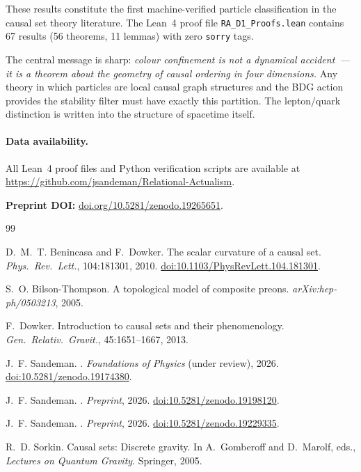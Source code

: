 \documentclass[11pt,a4paper]{article}
\begin{document}
These results constitute the first machine-verified particle classification
in the causal set theory literature. The Lean~4 proof file
\texttt{RA\_D1\_Proofs.lean} contains 67 results (56 theorems, 11 lemmas)
with zero \texttt{sorry} tags.

The central message is sharp: \emph{colour confinement is not a dynamical
accident~--- it is a theorem about the geometry of causal ordering in four
dimensions.} Any theory in which particles are local causal graph structures
and the BDG action provides the stability filter must have exactly this
partition. The lepton/quark distinction is written into the structure of
spacetime itself.

\bigskip
\paragraph{Data availability.}
All Lean~4 proof files and Python verification scripts are available
at \url{https://github.com/jsandeman/Relational-Actualism}.

\medskip
\noindent\textbf{Preprint DOI:} \href{https://doi.org/10.5281/zenodo.19265651}{doi.org/10.5281/zenodo.19265651}.

\begin{thebibliography}{99}

D.~M.~T. Benincasa and F.~Dowker.
\newblock The scalar curvature of a causal set.
\newblock \textit{Phys.\ Rev.\ Lett.}, 104:181301, 2010.
\newblock \href{https://doi.org/10.1103/PhysRevLett.104.181301}{doi:10.1103/PhysRevLett.104.181301}.

S.~O. Bilson-Thompson.
\newblock A topological model of composite preons.
\newblock \textit{arXiv:hep-ph/0503213}, 2005.

F.~Dowker.
\newblock Introduction to causal sets and their phenomenology.
\newblock \textit{Gen.\ Relativ.\ Gravit.}, 45:1651--1667, 2013.

J.~F. Sandeman.
.
\newblock \textit{Foundations of Physics} (under review), 2026.
\newblock \href{https://doi.org/10.5281/zenodo.19174380}{doi:10.5281/zenodo.19174380}.

J.~F. Sandeman.
.
\newblock \textit{Preprint}, 2026.
\newblock \href{https://doi.org/10.5281/zenodo.19198120}{doi:10.5281/zenodo.19198120}.

J.~F. Sandeman.
.
\newblock \textit{Preprint}, 2026.
\newblock \href{https://doi.org/10.5281/zenodo.19229335}{doi:10.5281/zenodo.19229335}.

R.~D. Sorkin.
\newblock Causal sets: Discrete gravity.
\newblock In A.~Gomberoff and D.~Marolf, eds., \textit{Lectures on Quantum Gravity}.
Springer, 2005.

\end{thebibliography}
\end{document}
